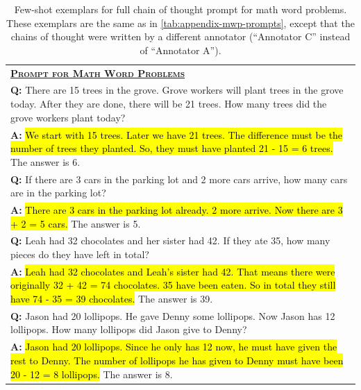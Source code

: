 \documentclass[]{article}
\theoremstyle{plain}
\theoremstyle{definition}
\theoremstyle{remark}
\begin{document}
\newpage
\begingroup
\begin{table}[H]
    \centering
    \small
    \caption{
    Few-shot exemplars for full chain of thought prompt for math word problems. These exemplars are the same as in \cref{tab:appendix-mwp-prompts}, except that the chains of thought were written by a different annotator (``Annotator C'' instead of ``Annotator A'').
    }
    \begin{tabular}{p{\linewidth}}
        \toprule
        \underline{\textbf{\textsc{Prompt for Math Word Problems}}} \\
        \vspace{-2mm}
        \textbf{Q:} There are 15 trees in the grove. Grove workers will plant trees in the grove today. After they are done, there will be 21 trees. How many trees did the grove workers plant today? \\
        \vspace{-1mm}
        \textbf{A:} \hl{We start with 15 trees. Later we have 21 trees. The difference must be the number of trees they planted. So, they must have planted 21 - 15 = 6 trees.} The answer is 6. \\
        \vspace{0mm}
        \textbf{Q:} If there are 3 cars in the parking lot and 2 more cars arrive, how many cars are in the parking lot? \\
        \vspace{-1mm}
        \textbf{A:} \hl{There are 3 cars in the parking lot already. 2 more arrive. Now there are 3 + 2 = 5 cars.}  The answer is 5. \\
        \vspace{0mm}
        \textbf{Q:} Leah had 32 chocolates and her sister had 42. If they ate 35, how many pieces do they have left in total? \\
        \vspace{-1mm}
        \textbf{A:} \hl{Leah had 32 chocolates and Leah's sister had 42. That means there were originally 32 + 42 = 74 chocolates. 35 have been eaten. So in total they still have 74 - 35 = 39 chocolates.} The answer is 39. \\
        \vspace{0mm}
        \textbf{Q:} Jason had 20 lollipops. He gave Denny some lollipops. Now Jason has 12 lollipops. How many lollipops did Jason give to Denny? \\
        \vspace{-1mm}
        \textbf{A:} \hl{Jason had 20 lollipops. Since he only has 12 now, he must have given the rest to Denny. The number of lollipops he has given to Denny must have been 20 - 12 = 8 lollipops.} The answer is 8. \\

\end{tabular}
\end{table}
\end{document}

